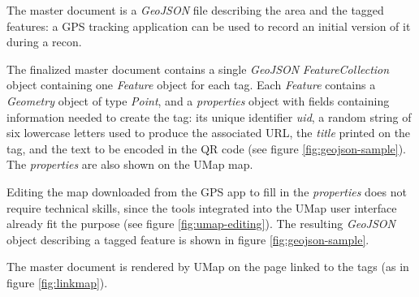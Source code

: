 \documentclass[sustainability,article,submit,pdftex,moreauthors]{Definitions/mdpi}
\begin{document}
The master document is a \emph{GeoJSON} file describing the area and the tagged features: a GPS tracking application can be used to record an initial version of it during a recon.

The finalized master document contains a single \emph{GeoJSON} \emph{FeatureCollection} object containing one \emph{Feature} object for each tag. Each \emph{Feature} contains a \emph{Geometry} object of type \emph{Point}, and a \emph{properties} object with fields containing information needed to create the tag: its unique identifier \emph{uid}, a random string of six lowercase letters used to produce the associated URL, the \emph{title} printed on the tag, and the text to be encoded in the QR code (see figure \ref{fig:geojson-sample}). The \emph{properties} are also shown on the UMap map. 

Editing the map downloaded from the GPS app to fill in the {\em properties} does not require technical skills, since the tools integrated into the UMap user interface already fit the purpose (see figure \ref{fig:umap-editing}). The resulting \emph{GeoJSON} object describing a tagged feature is shown in figure \ref{fig:geojson-sample}.

The master document is rendered by UMap on the page linked to the tags (as in figure \ref{fig:linkmap}).
\end{document}
